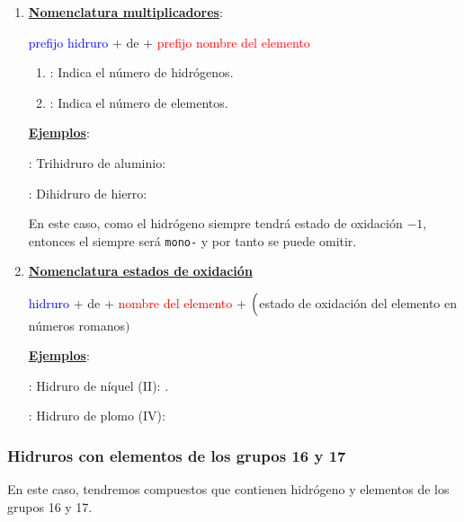 \documentclass[12pt]{article}
\begin{document}
\begin{enumerate}[label=\itembolascolor{\arabic*}{blue}]
    \item \textbf{\uline{Nomenclatura multiplicadores}}:
          \begin{center}
              \textcolor{blue}{prefijo} \textcolor{blue}{hidruro}  + de + \textcolor{red}{prefijo nombre del elemento }
          \end{center}

          \begin{enumerate}[label=\textcolor{red}{$\bullet$}]
              \item {}: Indica el número de hidrógenos.
              \item {}: Indica el número de elementos.
          \end{enumerate}

          \textbf{\uline{Ejemplos}}:

           : Trihidruro de aluminio: 

           : Dihidruro de hierro: 

En este caso, como el hidrógeno siempre tendrá estado de oxidación \(-1\), entonces el  siempre será \texttt{mono-} y por tanto se puede omitir.

    \item \textbf{\uline{Nomenclatura estados de oxidación}}
          \begin{center}
              \textcolor{blue}{hidruro} + de + \textcolor{red}{nombre del elemento} + $\Bigl($\textcolor{green!50!black}{estado de oxidación del elemento en números romanos}$\Bigr)$
          \end{center}

          \textbf{\uline{Ejemplos}}:

           : Hidruro de níquel (II): .

           : Hidruro de plomo (IV): 
\end{enumerate}


\subsubsection{Hidruros con elementos de los grupos 16 y 17}\label{sec:hidruros_16_17}

En este caso, tendremos compuestos que contienen hidrógeno y elementos de los grupos 16 y 17.
\end{document}

